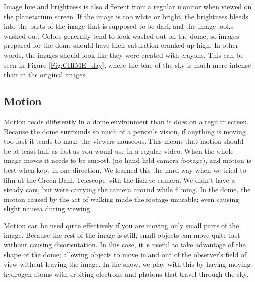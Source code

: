 Image hue and brightness is also different from a regular monitor when viewed on the planetarium screen. If the image is too white or bright, the brightness bleeds into the parts of the image that is supposed to be dark and the image looks washed out. Colors generally tend to look washed out on the dome, so images prepared for the dome should have their saturation cranked up high. In other words, the images should look like they were created with crayons. This can be seen in Figure \ref{Fig:CHIME_day}, where the blue of the sky is much more intense than in the original images. 


\subsection{Motion}

Motion reads differently in a dome environment than it does on a regular screen. Because the dome surrounds so much of a person's vision, if anything is moving too fast it tends to make the viewers nauseous. This means that motion should be at least half as fast as you would use in a regular video. When the whole image moves it needs to be smooth (no hand held camera footage), and motion is best when kept in one direction. We learned this the hard way when we tried to film at the Green Bank Telescope with the fisheye camera. We didn't have a steady cam, but were carrying the camera around while filming. In the dome, the motion caused by the act of walking made the footage unusable; even causing slight nausea during viewing.

Motion can be used quite effectively if you are moving only small parts of the image. Because the rest of the image is still, small objects can move quite fast without causing disorientation. In this case, it is useful to take advantage of the shape of the dome; allowing objects to move in and out of the observer's field of view without leaving the image. In the show, we play with this by having moving hydrogen atoms with orbiting electrons and photons that travel through the sky. 

